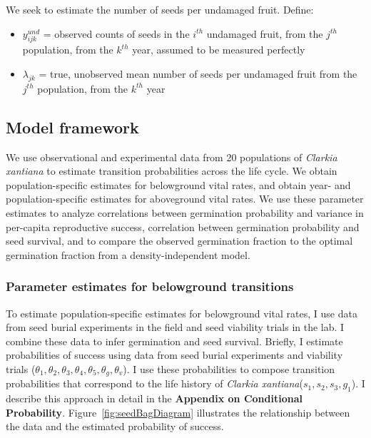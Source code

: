 \documentclass[12pt, oneside, titlepage]{article}   	%
\begin{document}
We seek to estimate the number of seeds per undamaged fruit. Define:

\begin{itemize}
	\item $y^{und}_{ijk}$ = observed counts of seeds in the $i^{th}$ undamaged fruit, from the $j^{th}$ population, from the $k^{th}$ year, assumed to be measured perfectly
	\item $\lambda_{jk}$ = true, unobserved mean number of seeds per undamaged fruit from the $j^{th}$ population, from the $k^{th}$ year
\end{itemize}

\subsection*{Model framework}

We use observational and experimental data from 20 populations of \textit{Clarkia xantiana} to estimate transition probabilities across the life cycle. We obtain population-specific estimates for belowground vital rates, and obtain year- and population-specific estimates for aboveground vital rates. We use these parameter estimates to analyze correlations between germination probability and variance in per-capita reproductive success, correlation between germination probability and seed survival, and to compare the observed germination fraction to the optimal germination fraction from a density-independent model. 

\subsubsection*{Parameter estimates for belowground transitions}

To estimate population-specific estimates for belowground vital rates, I use data from seed burial experiments in the field and seed viability trials in the lab. I combine these data to infer germination and seed survival. Briefly, I estimate probabilities of success using data from seed burial experiments and viability trials ($\theta_1, \theta_2, \theta_3, \theta_4, \theta_5, \theta_g, \theta_v$). I use these probabilities to compose transition probabilities that correspond to the life history of \textit{Clarkia xantiana}($s_1, s_2, s_3, g_1$). I describe this approach in detail in the \textbf{Appendix on Conditional Probability}. Figure~\ref{fig:seedBagDiagram} illustrates the relationship between the data and the estimated probability of success. 
 
\end{document}
